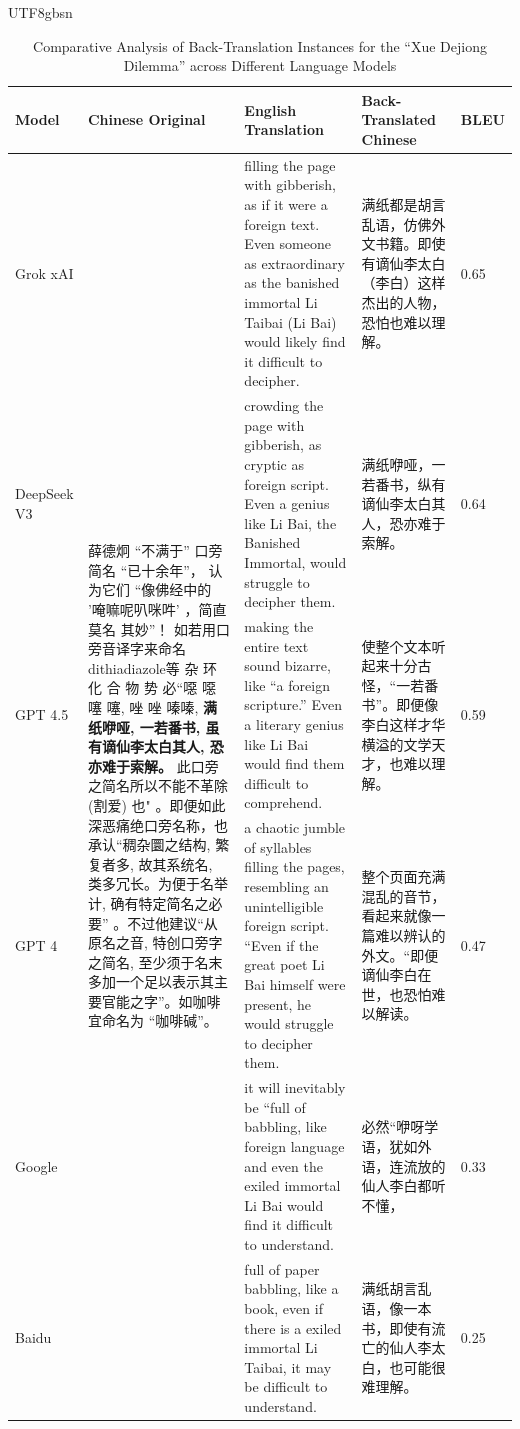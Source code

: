 \documentclass[conference]{IEEEtran}
\begin{document}
\begin{CJK}{UTF8}{gbsn}
\begin{table}[h]
\centering
\caption{Comparative Analysis of Back-Translation Instances for the ``Xue Dejiong Dilemma'' across Different Language Models}
\begin{tabular}{lp{4cm}p{4cm}p{4cm}l}
\toprule
Model & Chinese Original & English Translation & Back-Translated Chinese & BLEU \\
\midrule
Grok xAI & \multirow{8}{}{\parbox{3.6cm}{薛德炯 ``不满于'' 口旁简名 ``已十余年''， 认为它们 ``像佛经中的 '唵嘛呢叭咪吽' ，简直莫名 其妙''！ 如若用口旁音译字来命名 dithiadiazole等 杂 环 化 合 物 势 必``噁 噁 噻 噻, 唑 唑 嗪嗪, \textbf{满纸咿哑,  一若番书,  虽有谪仙李太白其人, 恐亦难于索解。} 此口旁之简名所以不能不革除 (割爱) 也"  。即便如此深恶痛绝口旁名称，也承认``稠杂圜之结构, 繁复者多,  故其系统名,  类多冗长。为便于名举计, 确有特定简名之必 要'' 。不过他建议``从原名之音,  特创口旁字之简名,  至少须于名末多加一个足以表示其主要官能之字''。如咖啡宜命名为 ``咖啡碱''。}} & filling the page with gibberish, as if it were a foreign text. Even someone as extraordinary as the banished immortal Li Taibai (Li Bai) would likely find it difficult to decipher. & 满纸都是胡言乱语，仿佛外文书籍。即使有谪仙李太白（李白）这样杰出的人物，恐怕也难以理解。 & 0.65 \\
DeepSeek V3 & & crowding the page with gibberish, as cryptic as foreign script. Even a genius like Li Bai, the Banished Immortal, would struggle to decipher them. & 满纸咿哑，一若番书，纵有谪仙李太白其人，恐亦难于索解。 & 0.64 \\
GPT 4.5 & & making the entire text sound bizarre, like ``a foreign scripture.'' Even a literary genius like Li Bai would find them difficult to comprehend. & 使整个文本听起来十分古怪，``一若番书''。即便像李白这样才华横溢的文学天才，也难以理解。 & 0.59 \\
GPT 4 & & a chaotic jumble of syllables filling the pages, resembling an unintelligible foreign script. ``Even if the great poet Li Bai himself were present, he would struggle to decipher them. & 整个页面充满混乱的音节，看起来就像一篇难以辨认的外文。``即便谪仙李白在世，也恐怕难以解读。 & 0.47 \\
Google & & it will inevitably be ``full of babbling, like foreign language and even the exiled immortal Li Bai would find it difficult to understand. & 必然``咿呀学语，犹如外语，连流放的仙人李白都听不懂， & 0.33 \\
Baidu & & full of paper babbling, like a book, even if there is a exiled immortal Li Taibai, it may be difficult to understand. & 满纸胡言乱语，像一本书，即使有流亡的仙人李太白，也可能很难理解。 & 0.25 \\

\end{tabular}
\end{table}
\end{CJK}
\end{document}
